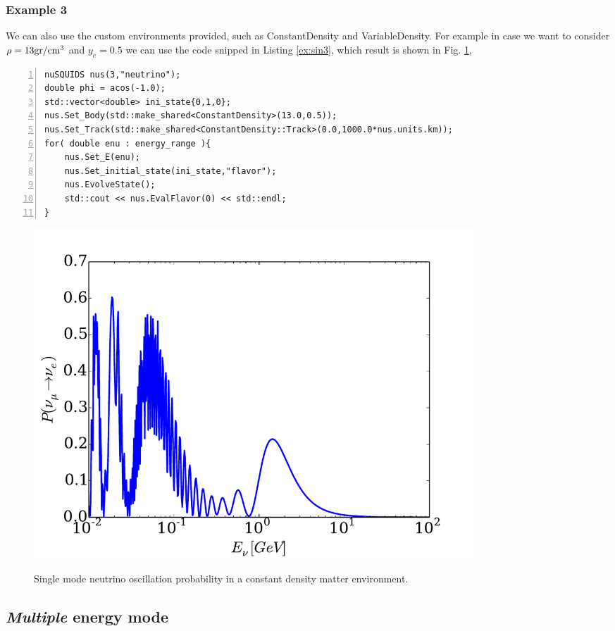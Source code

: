 \documentclass[3p,12pt,authoryear]{elsarticle}
\newcommand{\ttf}{\ttfamily}
\begin{document}
\subsubsection{Example 3}

We can also use the custom environments provided, such as {\ttf ConstantDensity} and {\ttf VariableDensity}. For example in case we want to consider $\rho = 13 {\rm gr}/{\rm cm}^3$ and $y_e = 0.5$ we can use the code snipped in Listing \ref{ex:sin3}, which result is shown in Fig. \ref{fig:nu_mu_nue_single_energy},

\begin{lstlisting}[frame=leftline, numbers = left,breaklines=true, label = ex:sin3]
nuSQUIDS nus(3,"neutrino");
double phi = acos(-1.0);
std::vector<double> ini_state{0,1,0};
nus.Set_Body(std::make_shared<ConstantDensity>(13.0,0.5));
nus.Set_Track(std::make_shared<ConstantDensity::Track>(0.0,1000.0*nus.units.km));
for( double enu : energy_range ){
	nus.Set_E(enu);
	nus.Set_initial_state(ini_state,"flavor");
	nus.EvolveState();
	std::cout << nus.EvalFlavor(0) << std::endl;
}
\end{lstlisting}

\begin{figure}[h]
\begin{center}
\label{fig:nu_mu_nue_single_energy}
\includegraphics[width=0.8\textwidth]{../fig/nu_mu_nue_single_energy.pdf}
\caption{Single mode neutrino oscillation probability in a constant density matter environment.}
\end{center}
\end{figure}

\subsection{{\it Multiple} energy mode}
\end{document}
